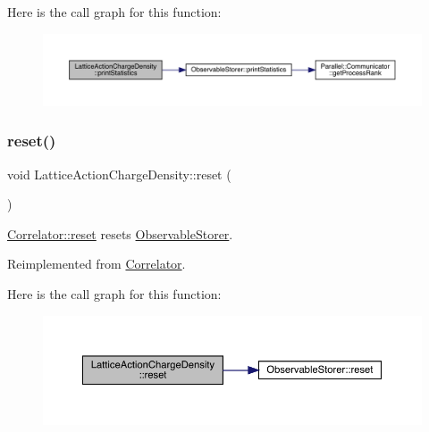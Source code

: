 Here is the call graph for this function\+:\nopagebreak
\begin{figure}[H]
\begin{center}
\leavevmode
\includegraphics[width=350pt]{class_lattice_action_charge_density_abdaa497dd70dee58b810de7315241a56_cgraph}
\end{center}
\end{figure}
\mbox{\label{class_lattice_action_charge_density_aebbc2cc72334e7b33d9cce2ad469280b}} 
\subsubsection{\texorpdfstring{reset()}{reset()}}
{\footnotesize\ttfamily void Lattice\+Action\+Charge\+Density\+::reset (\begin{DoxyParamCaption}{ }\end{DoxyParamCaption})\hspace{0.3cm}{\ttfamily [virtual]}}



\mbox{\hyperlink{class_correlator_aacca40262d2cd62f0a3964e832f948c1}{Correlator\+::reset}} resets \mbox{\hyperlink{class_observable_storer}{Observable\+Storer}}. 



Reimplemented from \mbox{\hyperlink{class_correlator_aacca40262d2cd62f0a3964e832f948c1}{Correlator}}.

Here is the call graph for this function\+:\nopagebreak
\begin{figure}[H]
\begin{center}
\leavevmode
\includegraphics[width=350pt]{class_lattice_action_charge_density_aebbc2cc72334e7b33d9cce2ad469280b_cgraph}
\end{center}
\end{figure}
\mbox{\label{class_lattice_action_charge_density_a21d608703811d2814e7f654588eaa0c0}} 

